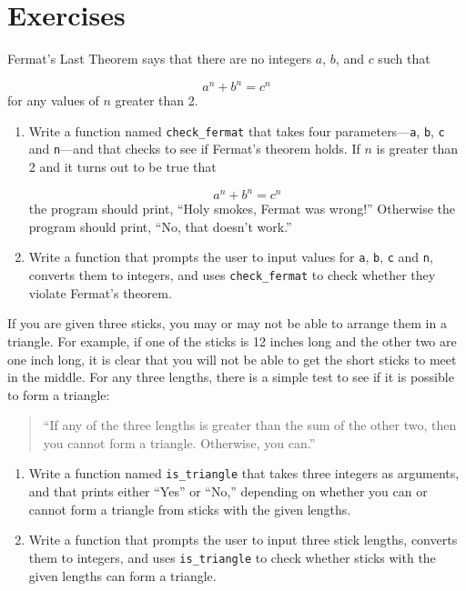 \documentclass[10pt]{book}
\begin{document}
\section{Exercises}

\begin{ex}

Fermat's Last Theorem says that there are no integers
$a$, $b$, and $c$ such that

\[ a^n + b^n = c^n \]
%
for any values of $n$ greater than 2.

\begin{enumerate}

\item Write a function named \verb"check_fermat" that takes four
parameters---{\tt a}, {\tt b}, {\tt c} and {\tt n}---and
that checks to see if Fermat's theorem holds.  If
$n$ is greater than 2 and it turns out to be true that 

\[a^n + b^n = c^n \]
%
the program should print, ``Holy smokes, Fermat was wrong!''
Otherwise the program should print, ``No, that doesn't work.''

\item Write a function that prompts the user to input values
for {\tt a}, {\tt b}, {\tt c} and {\tt n}, converts them to
integers, and uses \verb"check_fermat" to check whether they
violate Fermat's theorem.

\end{enumerate}

\end{ex}


\begin{ex}

If you are given three sticks, you may or may not be able to arrange
them in a triangle.  For example, if one of the sticks is 12 inches
long and the other two are one inch long, it is clear that you will
not be able to get the short sticks to meet in the middle.  For any
three lengths, there is a simple test to see if it is possible to form
a triangle:

\begin{quotation}
``If any of the three lengths is greater than the sum of the other two,
then you cannot form a triangle.  Otherwise, you can.''
\end{quotation}

\begin{enumerate}

\item Write a function named \verb"is_triangle" that takes three
  integers as arguments, and that prints either ``Yes'' or ``No,'' depending
  on whether you can or cannot form a triangle from sticks with the
  given lengths.

\item Write a function that prompts the user to input three stick
  lengths, converts them to integers, and uses \verb"is_triangle" to
  check whether sticks with the given lengths can form a triangle.

\end{enumerate}

\end{ex}
\end{document}
